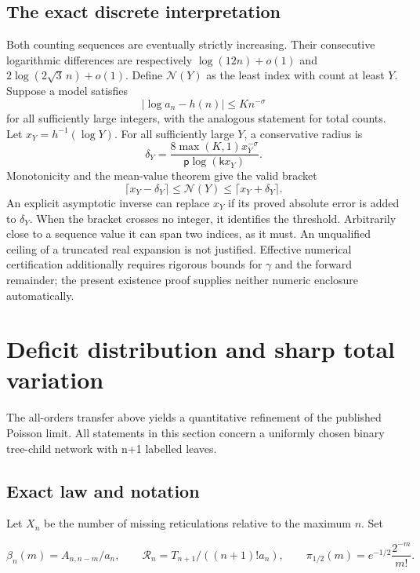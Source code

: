 \documentclass[11pt,letterpaper]{article}
\theoremstyle{remark}
\begin{document}
\subsection{The exact discrete interpretation}
Both counting sequences are eventually strictly increasing. Their consecutive logarithmic differences are respectively $\log(12n)+o(1)$ and $2\log(2\sqrt3\,n)+o(1)$. Define $\mathcal N(Y)$ as the least index with count at least $Y$. Suppose a model satisfies
\[
 |\log a_n-h(n)|\le K n^{-\sigma}
\]
for all sufficiently large integers, with the analogous statement for total counts. Let $x_Y=h^{-1}(\log Y)$. For all sufficiently large $Y$, a conservative radius is
\[
 \delta_Y=\frac{8\max(K,1)x_Y^{-\sigma}}{\mathsf p\log(\mathsf kx_Y)}.
\]
Monotonicity and the mean-value theorem give the valid bracket
\begin{equation}
 \lceil x_Y-\delta_Y\rceil\le \mathcal N(Y)\le\lceil x_Y+\delta_Y\rceil.          \label{tcn:b:threshold}
\end{equation}
An explicit asymptotic inverse can replace $x_Y$ if its proved absolute error is added to $\delta_Y$. When the bracket crosses no integer, it identifies the threshold. Arbitrarily close to a sequence value it can span two indices, as it must. An unqualified ceiling of a truncated real expansion is not justified. Effective numerical certification additionally requires rigorous bounds for $\gamma$ and the forward remainder; the present existence proof supplies neither numeric enclosure automatically.

\section{Deficit distribution and sharp total
variation}\label{tcn:b:sec:deficit}

The all-orders transfer above yields a quantitative refinement of the
published Poisson limit. All statements in this section concern a
uniformly chosen binary tree-child network with n+1 labelled leaves.

\subsection{Exact law and notation}\label{tcn:b:exact-law-and-notation}

Let \(X_n\) be the number of missing reticulations relative to the
maximum \(n\). Set

\[
 \beta_n(m)=A_{n,n-m}/a_n,\qquad
 \mathcal R_n=T_{n+1}/((n+1)!a_n),\qquad
 \pi_{1/2}(m)=e^{-1/2}\frac{2^{-m}}{m!}.
\]
\end{document}
